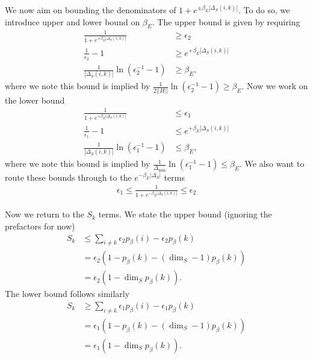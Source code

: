 \documentclass{article}
\newcommand{\norm}[1]{\left| \left| #1 \right| \right|}
\begin{document}
We now aim on bounding the denominators of $1 + e^{\pm \beta_E |\Delta_S(i,k)|}$. To do so, we introduce upper and lower bound on $\beta_E$. The upper bound is given by requiring 
\begin{align}
    \frac{1}{1 + e^{+\beta_E |\Delta_S(i,k)|}} &\geq \epsilon_2 \\
    \frac{1}{\epsilon_2} - 1 &\geq e^{+\beta_E |\Delta_S(i,k)|} \\
    \frac{1}{|\Delta_S(i,k)|} \ln (\epsilon_2^{-1} - 1) &\geq \beta_E,
\end{align}
where we note this bound is implied by $\frac{1}{2 \norm{H}} \ln(\epsilon_2^{-1} - 1 ) \geq \beta_E$. Now we work on the lower bound
\begin{align}
    \frac{1}{1 + e^{+\beta_E |\Delta_S(i,k)|}} &\leq \epsilon_1 \\
    \frac{1}{\epsilon_1} - 1 &\leq e^{+\beta_E |\Delta_S(i,k)|} \\
    \frac{1}{|\Delta_S(i,k)|} \ln (\epsilon_1^{-1} - 1) &\leq \beta_E,
\end{align}
where we note this bound is implied by $\frac{1}{\Delta_{\min}} \ln (\epsilon_1^{-1} - 1) \leq \beta_E$. We also want to route these bounds through to the $e^{-\beta_E |\Delta_S|}$ terms
\begin{align}
    \epsilon_1 \leq \frac{1}{1 + e^{-\beta_E |\Delta_S(i,k)|}} \leq \epsilon_2
\end{align}

Now we return to the $S_k$ terms. We state the upper bound (ignoring the prefactors for now)
\begin{align}
    S_k &\leq \sum_{i \neq k} \epsilon_{2} p_{\beta}(i) - \epsilon_{2} p_{\beta}(k) \\
    &= \epsilon_{2} (1 - p_{\beta}(k) - (\dim_S - 1)p_{\beta}(k)) \\
    &= \epsilon_{2}(1 - \dim_S p_{\beta}(k)).
\end{align}
The lower bound follows similarly
\begin{align}
    S_{k} &\geq \sum_{i \neq k} \epsilon_{1} p_{\beta}(i) - \epsilon_{1} p_{\beta}(k) \\
    &= \epsilon_{1}(1 - p_{\beta}(k) - (\dim_S - 1) p_{\beta}(k)) \\
    &= \epsilon_{1}(1 - \dim_S p_{\beta}(k)).
\end{align}
\end{document}
